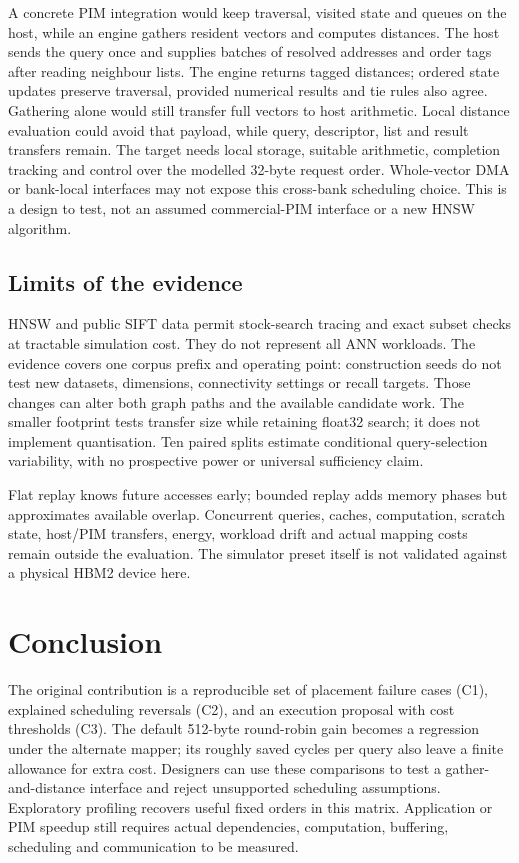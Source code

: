 \documentclass[conference]{IEEEtran}
\begin{document}
A concrete PIM integration would keep traversal, visited state and queues on the host, while an engine gathers resident vectors and computes distances. The host sends the query once and supplies batches of resolved addresses and order tags after reading neighbour lists. The engine returns tagged distances; ordered state updates preserve traversal, provided numerical results and tie rules also agree. Gathering alone would still transfer full vectors to host arithmetic. Local distance evaluation could avoid that payload, while query, descriptor, list and result transfers remain. The target needs local storage, suitable arithmetic, completion tracking and control over the modelled 32-byte request order. Whole-vector DMA or bank-local interfaces may not expose this cross-bank scheduling choice. This is a design to test, not an assumed commercial-PIM interface or a new HNSW algorithm.

\subsection{Limits of the evidence}
HNSW and public SIFT data permit stock-search tracing and exact subset checks at tractable simulation cost. They do not represent all ANN workloads. The evidence covers one corpus prefix and operating point: construction seeds do not test new datasets, dimensions, connectivity settings or recall targets. Those changes can alter both graph paths and the available candidate work. The smaller footprint tests transfer size while retaining float32 search; it does not implement quantisation. Ten paired splits estimate conditional query-selection variability, with no prospective power or universal sufficiency claim.

Flat replay knows future accesses early; bounded replay adds memory phases but approximates available overlap. Concurrent queries, caches, computation, scratch state, host/PIM transfers, energy, workload drift and actual mapping costs remain outside the evaluation. The simulator preset itself is not validated against a physical HBM2 device here.

\section{Conclusion}
The original contribution is a reproducible set of placement failure cases (C1), explained scheduling reversals (C2), and an execution proposal with cost thresholds (C3). The default 512-byte round-robin gain becomes a regression under the alternate mapper; its roughly \RoundRobinBFSSavedFloat{} saved cycles per query also leave a finite allowance for extra cost. Designers can use these comparisons to test a gather-and-distance interface and reject unsupported scheduling assumptions. Exploratory profiling recovers useful fixed orders in this matrix. Application or PIM speedup still requires actual dependencies, computation, buffering, scheduling and communication to be measured.

\begingroup\raggedright

\endgroup
\end{document}
